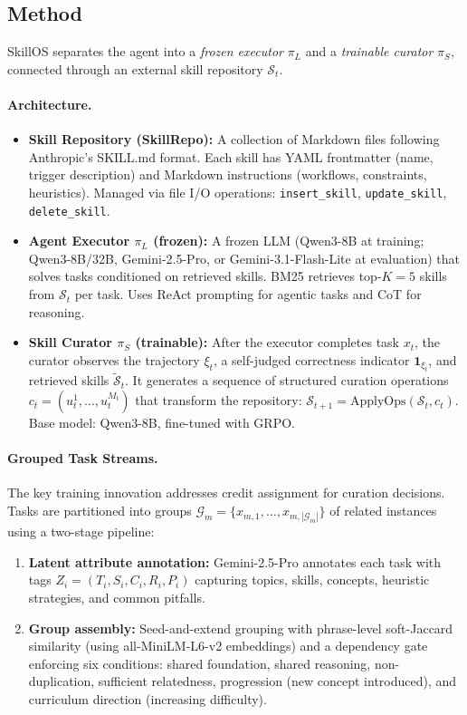 \documentclass[11pt]{article}
\begin{document}
\subsection{Method}

SkillOS separates the agent into a \emph{frozen executor} $\pi_L$ and a \emph{trainable curator} $\pi_S$, connected through an external skill repository $\mathcal{S}_t$.

\paragraph{Architecture.}
\begin{itemize}
    \item \textbf{Skill Repository (SkillRepo):} A collection of Markdown files following Anthropic's SKILL.md format. Each skill has YAML frontmatter (name, trigger description) and Markdown instructions (workflows, constraints, heuristics). Managed via file I/O operations: \texttt{insert\_skill}, \texttt{update\_skill}, \texttt{delete\_skill}.
    \item \textbf{Agent Executor $\pi_L$ (frozen):} A frozen LLM (Qwen3-8B at training; Qwen3-8B/32B, Gemini-2.5-Pro, or Gemini-3.1-Flash-Lite at evaluation) that solves tasks conditioned on retrieved skills. BM25 retrieves top-$K{=}5$ skills from $\mathcal{S}_t$ per task. Uses ReAct prompting for agentic tasks and CoT for reasoning.
    \item \textbf{Skill Curator $\pi_S$ (trainable):} After the executor completes task $x_t$, the curator observes the trajectory $\xi_t$, a self-judged correctness indicator $\mathbf{1}_{\xi_t}$, and retrieved skills $\tilde{\mathcal{S}}_t$. It generates a sequence of structured curation operations $c_t = (u_t^1, \ldots, u_t^{M_t})$ that transform the repository: $\mathcal{S}_{t+1} = \mathrm{ApplyOps}(\mathcal{S}_t, c_t)$. Base model: Qwen3-8B, fine-tuned with GRPO.
\end{itemize}

\paragraph{Grouped Task Streams.}
The key training innovation addresses credit assignment for curation decisions. Tasks are partitioned into groups $\mathcal{G}_m = \{x_{m,1}, \ldots, x_{m,|\mathcal{G}_m|}\}$ of related instances using a two-stage pipeline:

\begin{enumerate}
    \item \textbf{Latent attribute annotation:} Gemini-2.5-Pro annotates each task with tags $Z_i = (T_i, S_i, C_i, R_i, P_i)$ capturing topics, skills, concepts, heuristic strategies, and common pitfalls.
    \item \textbf{Group assembly:} Seed-and-extend grouping with phrase-level soft-Jaccard similarity (using all-MiniLM-L6-v2 embeddings) and a dependency gate enforcing six conditions: shared foundation, shared reasoning, non-duplication, sufficient relatedness, progression (new concept introduced), and curriculum direction (increasing difficulty).
\end{enumerate}
\end{document}
